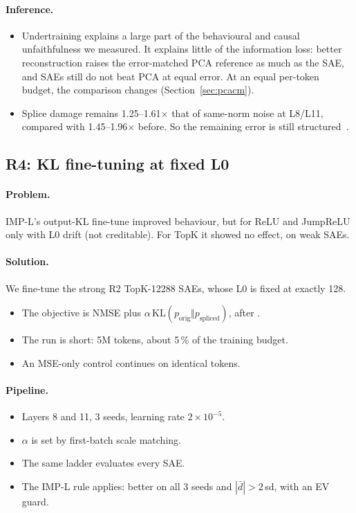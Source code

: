 \paragraph{Inference.}
\begin{itemize}
\item Undertraining explains a large part of the behavioural and causal unfaithfulness we measured. It explains little
  of the information loss: better reconstruction raises the error-matched PCA reference as much as the SAE, and SAEs
  still do not beat PCA at equal error. At an equal per-token budget, the comparison changes
  (Section~\ref{sec:pcacm}).
\item Splice damage remains 1.25--1.61$\times$ that of same-norm noise at L8/L11, compared with 1.45--1.96$\times$
  before. So the remaining error is still structured~\citep{engels2024darkmatter}.
\end{itemize}





\subsection{R4: KL fine-tuning at fixed L0}\label{sec:r4}

\paragraph{Problem.} IMP-L's output-KL fine-tune improved behaviour, but for ReLU and JumpReLU only with L0 drift
(not creditable). For TopK it showed no effect, on weak SAEs.

\paragraph{Solution.} We fine-tune the strong R2 TopK-12288 SAEs, whose L0 is fixed at exactly 128.
\begin{itemize}
\item The objective is NMSE plus $\alpha\,$KL$(p_{\text{orig}}\Vert p_{\text{spliced}})$, after \citet{karvonen2025kl}.
\item The run is short: 5M tokens, about 5\,\% of the training budget.
\item An MSE-only control continues on identical tokens.
\end{itemize}

\paragraph{Pipeline.}
\begin{itemize}
\item Layers 8 and 11, 3 seeds, learning rate $2\times10^{-5}$.
\item $\alpha$ is set by first-batch scale matching.
\item The same ladder evaluates every SAE.
\item The IMP-L rule applies: better on all 3 seeds and $|\bar d|>2\,$sd, with an EV guard.
\end{itemize}

